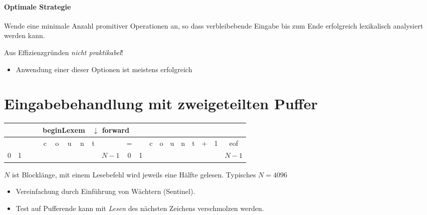 \paragraph{Optimale Strategie} Wende eine minimale Anzahl promitiver Operationen an, so dass verbleibebende Eingabe bis zum Ende erfolgreich lexikalisch analysiert werden kann.

Aus Effizienzgründen \emph{nicht praktikabel}!
\begin{itemize}
 \item Anwendung einer dieser Optionen ist meistens erfolgreich
\end{itemize}

\section{Eingabebehandlung mit zweigeteilten Puffer}
\begin{longtable}{|c|c|c|c|c|c|c|c|c|c||c|c|c|c|c|c|c|c|c|c|}
   &   & & & \multicolumn{4}{l}{beginLexem} & \multicolumn{4}{l}{$\downarrow$ forward} \\
 \hline
   &   & & & c & o & u & n & t & & = & & c & o & u & n & t & + & 1 & eof \\\hline
 0 & 1 & & & & & & & & $N-1$ & 0 & 1 & & & & & & & & $N-1$
\end{longtable}
$N$ ist Blocklänge, mit einem Lesebefehl wird jeweils eine Hälfte gelesen. Typisches $N = 4096$\\
\begin{itemize}
 \item Vereinfachung durch Einführung von Wächtern (Sentinel).
 \item Test auf Pufferende kann mit \emph{Lesen} des nächsten Zeichens verschmolzen werden.
\end{itemize}





